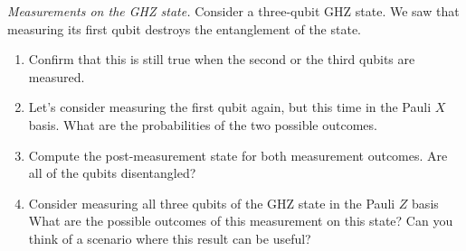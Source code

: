 \begin{exercise}
\emph{Measurements on the GHZ state.} Consider a three-qubit GHZ state. We saw that measuring its first qubit destroys the entanglement of the state.
\begin{enumerate}[label=(\alph*)]
    \item Confirm that this is still true when the second or the third qubits are measured.
    \item Let's consider measuring the first qubit again, but this time in the Pauli $X$ basis. What are the probabilities of the two possible outcomes.
    \item Compute the post-measurement state for both measurement outcomes. Are all of the qubits disentangled?
    \item Consider measuring all three qubits of the GHZ state in the Pauli $Z$ basis What are the possible outcomes of this measurement on this state? Can you think of a scenario where this result can be useful?
\end{enumerate}
\end{exercise}
